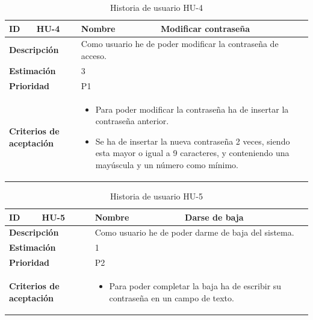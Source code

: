 \begin{table}[H]
    \centering
    \begin{tabular}{|p{2cm}|p{4cm}|p{2cm}|p{4cm}|}
        \hline
        \textbf{ID} & HU-4 & \textbf{Nombre} & Modificar contraseña \\
        \hline
        \multicolumn{2}{|p{6cm}|}{\textbf{Descripción}} & \multicolumn{2}{p{6cm}|}{Como usuario he de poder modificar la contraseña de acceso.} \\
        \hline
        \multicolumn{2}{|p{6cm}|}{\textbf{Estimación}} & \multicolumn{2}{p{6cm}|}{3} \\
        \hline
        \multicolumn{2}{|p{6cm}|}{\textbf{Prioridad}} & \multicolumn{2}{p{6cm}|}{P1} \\
        \hline
        \multicolumn{2}{|p{6cm}|}{\textbf{Criterios de aceptación}} & \multicolumn{2}{p{6cm}|}{
            \begin{itemize}
                \item Para poder modificar la contraseña ha de insertar la contraseña anterior.
                \item Se ha de insertar la nueva contraseña 2 veces, siendo esta  mayor o igual a 9 caracteres, y conteniendo una mayúscula y un número como mínimo.
            \end{itemize}
        } \\
        \hline
    \end{tabular}
    \caption{Historia de usuario HU-4}
    \label{tab:hu_4}
\end{table}

\begin{table}[H]
    \centering
    \begin{tabular}{|p{2cm}|p{4cm}|p{2cm}|p{4cm}|}
        \hline
        \textbf{ID} & HU-5 & \textbf{Nombre} & Darse de baja \\
        \hline
        \multicolumn{2}{|p{6cm}|}{\textbf{Descripción}} & \multicolumn{2}{p{6cm}|}{Como usuario
        he de poder darme de baja del sistema.} \\
        \hline
        \multicolumn{2}{|p{6cm}|}{\textbf{Estimación}} & \multicolumn{2}{p{6cm}|}{1} \\
        \hline
        \multicolumn{2}{|p{6cm}|}{\textbf{Prioridad}} & \multicolumn{2}{p{6cm}|}{P2} \\
        \hline
        \multicolumn{2}{|p{6cm}|}{\textbf{Criterios de aceptación}} & \multicolumn{2}{p{6cm}|}{
            \begin{itemize}
                \item Para poder completar la baja ha de escribir su contraseña en un campo de texto.
            \end{itemize}
        } \\
        \hline
    \end{tabular}
    \caption{Historia de usuario HU-5}
    \label{tab:hu_5}
\end{table}

